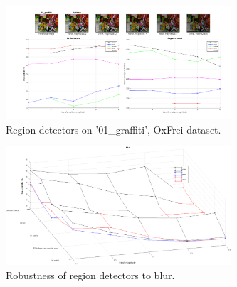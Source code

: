 \documentclass{article}
\begin{document}
\begin{figure}[htb]
\centering
\begin{minipage}[b]{.99\linewidth}
  \centering
 \centerline{\includegraphics[width=8.4cm]{./Figs/repeatability_all_combined_01_graffiti_ligthing_good}}
\end{minipage}
\hfill
\caption{Region detectors on '01\_graffiti', OxFrei dataset.}
\label{fig:det_frei}
%
\end{figure}

\begin{figure}[htb]

\begin{minipage}[b]{.9\linewidth}
  \centering
  \centerline{\includegraphics[width=8.4cm]{./Figs/blur_some_combined}}
\end{minipage}
\hfill
\caption{Robustness of region detectors to blur.}
\label{fig:blur}
%
\end{figure}
\end{document}
